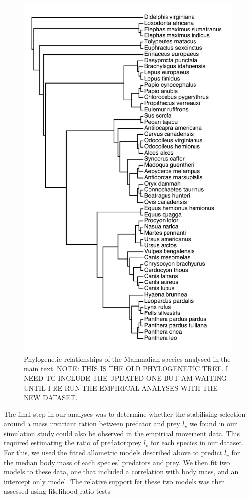 \documentclass[12pt]{article}
\begin{document}
\begin{figure}[!h]
\centering
\includegraphics[scale=0.5]{Mammalia.pdf}
\caption{Phylogenetic relationships of the Mammalian species analysed in the main text. NOTE: THIS IS THE OLD PHYLOGENETIC TREE. I NEED TO INCLUDE THE UPDATED ONE BUT AM WAITING UNTIL I RE-RUN THE EMPIRICAL ANALYSES WITH THE NEW DATASET.}
\label{fig:phylogeny}
\end{figure}

The final step in our analyses was to determine whether the stabilising selection around a mass invariant ration between predator and prey $l_v$ we found in our simulation study could also be observed in the empirical movement data. This required estimating the ratio of predator:prey $l_v$ for each species in our dataset. For this, we used the fitted allometric models described above to predict $l_v$ for the median body mass of each species' predators and prey. We then fit two models to these data, one that included a correlation with body mass, and an intercept only model. The relative support for these two models was then assessed using likelihood ratio tests.

\end{document}
